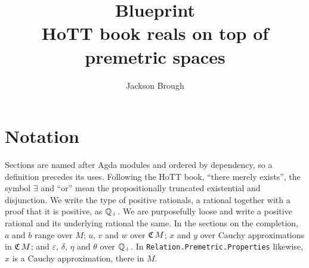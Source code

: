\documentclass[11pt]{article}
\title{Blueprint\\
  \large HoTT book reals on top of premetric spaces}
\author{Jackson Brough}
\date{}
\begin{document}
\maketitle
\listoftodos

\section*{Notation}

Sections are named after Agda modules and ordered by dependency, so a definition precedes its uses. Following the HoTT book, ``there merely exists'', the symbol $\exists$ and ``or'' mean the propositionally truncated existential and disjunction.
We write the type of positive rationals, a rational together with a proof that it is positive, as $\mathbb{Q}_{+}$. We are purposefully loose and write a positive rational and its underlying rational the same.
In the sections on the completion, $a$ and $b$ range over $M$; $u$, $v$ and $w$ over $\mathfrak{C}\,M$; $x$ and $y$ over Cauchy approximations in $\mathfrak{C}\,M$; and $\varepsilon$, $\delta$, $\eta$ and $\theta$ over $\mathbb{Q}_{+}$. In \texttt{Relation.Premetric.Properties} likewise, $x$ is a Cauchy approximation, there in $M$.
\end{document}
